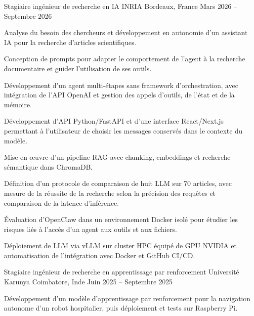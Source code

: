 
\begin{cventries}
  \cventry
    {Stagiaire ingénieur de recherche en IA}
    {INRIA}
    {Bordeaux, France}
    {Mars 2026 -- Septembre 2026}
    {
      \begin{cvitems}
        \item {Analyse du besoin des chercheurs et développement en autonomie d’un assistant IA pour la recherche d’articles scientifiques.}
        \item {Conception de prompts pour adapter le comportement de l’agent à la recherche documentaire et guider l’utilisation de ses outils.}
        \item {Développement d’un agent multi-étapes sans framework d’orchestration, avec intégration de l’API OpenAI et gestion des appels d’outils, de l’état et de la mémoire.}
        \item {Développement d’API Python/FastAPI et d’une interface React/Next.js permettant à l’utilisateur de choisir les messages conservés dans le contexte du modèle.}
        \item {Mise en œuvre d’un pipeline RAG avec chunking, embeddings et recherche sémantique dans ChromaDB.}
        \item {Définition d’un protocole de comparaison de huit LLM sur 70 articles, avec mesure de la réussite de la recherche selon la précision des requêtes et comparaison de la latence d’inférence.}
        \item {Évaluation d’OpenClaw dans un environnement Docker isolé pour étudier les risques liés à l’accès d’un agent aux outils et aux fichiers.}
        \item {Déploiement de LLM via vLLM sur cluster HPC équipé de GPU NVIDIA et automatisation de l’intégration avec Docker et GitHub CI/CD.}
      \end{cvitems}
    }

  \cventry
    {Stagiaire ingénieur de recherche en apprentissage par renforcement}
    {Université Karunya}
    {Coimbatore, Inde}
    {Juin 2025 -- Septembre 2025}
    {
      \begin{cvitems}
        \item {Développement d’un modèle d’apprentissage par renforcement pour la navigation autonome d’un robot hospitalier, puis déploiement et tests sur Raspberry Pi.}
      \end{cvitems}
    }
\end{cventries}
